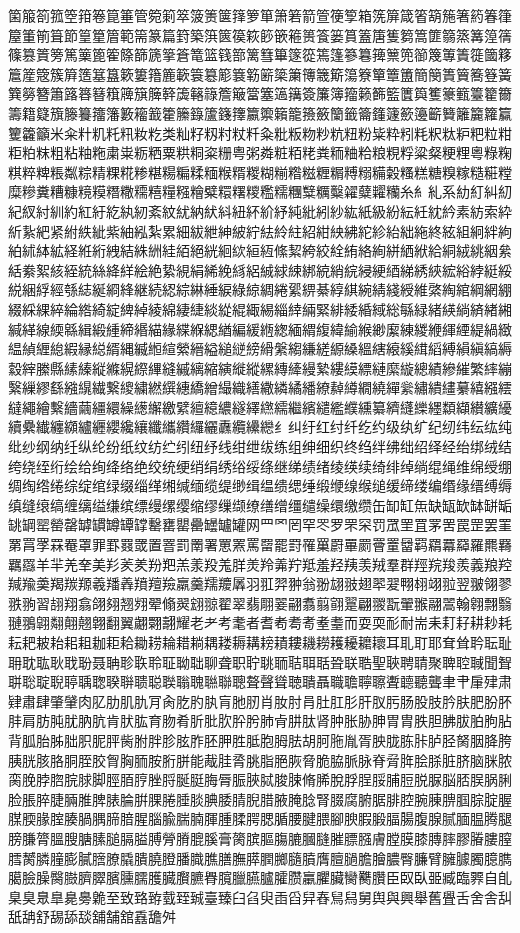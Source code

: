 箘箙箚箛箜箝箞箟箠管箢箣箤箥箦箧箨箩箪箫箬箭箮箯箰箱箲箳箴箵箶箷箸箹箺箻箼箽箾箿節篁篂篃範篅篆篇篈築篊篋篌篍篎篏篐篑篒篓篔篕篖篗篘篙篚篛篜篝篞篟篠篡篢篣篤篥篦篧篨篩篪篫篬篭篮篯篰篱篲篳篴篵篶篷篸篹篺篻篼篽篾篿簀簁簂簃簄簅簆簇簈簉簊簋簌簍簎簏簐簑簒簓簔簕簖簗簘簙簚簛簜簝簞簟簠簡簢簣簤簥簦簧簨簩簪簫簬簭簮簯簰簱簲簳簴簵簶簷簸簹簺簻簼簽簾簿籀籁籂籃籄籅籆籇籈籉籊籋籌籍籎籏籐籑籒籓籔籕籖籗籘籙籚籛籜籝籞籟籠籡籢籣籤籥籦籧籨籩籪籫籬籭籮籯籰籱籲米籴籵籶籷籸籹籺类籼籽籾籿粀粁粂粃粄粅粆粇粈粉粊粋粌粍粎粏粐粑粒粓粔粕粖粗粘粙粚粛粜粝粞粟粠粡粢粣粤粥粦粧粨粩粪粫粬粭粮粯粰粱粲粳粴粵粶粷粸粹粺粻粼粽精粿糀糁糂糃糄糅糆糇糈糉糊糋糌糍糎糏糐糑糒糓糔糕糖糗糘糙糚糛糜糝糞糟糠糡糢糣糤糥糦糧糨糩糪糫糬糭糮糯糰糱糲糳糴糵糶糷糸糹糺系糼糽糾糿紀紁紂紃約紅紆紇紈紉紊紋紌納紎紏紐紑紒紓純紕紖紗紘紙級紛紜紝紞紟素紡索紣紤紥紦紧紨紩紪紫紬紭紮累細紱紲紳紴紵紶紷紸紹紺紻紼紽紾紿絀絁終絃組絅絆絇絈絉絊絋経絍絎絏結絑絒絓絔絕絖絗絘絙絚絛絜絝絞絟絠絡絢絣絤絥給絧絨絩絪絫絬絭絮絯絰統絲絳絴絵絶絷絸絹絺絻絼絽絾絿綀綁綂綃綄綅綆綇綈綉綊綋綌綍綎綏綐綑綒經綔綕綖綗綘継続綛綜綝綞綟綠綡綢綣綤綥綦綧綨綩綪綫綬維綮綯綰綱網綳綴綵綶綷綸綹綺綻綼綽綾綿緀緁緂緃緄緅緆緇緈緉緊緋緌緍緎総緐緑緒緓緔緕緖緗緘緙線緛緜緝緞緟締緡緢緣緤緥緦緧編緩緪緫緬緭緮緯緰緱緲緳練緵緶緷緸緹緺緻緼緽緾緿縀縁縂縃縄縅縆縇縈縉縊縋縌縍縎縏縐縑縒縓縔縕縖縗縘縙縚縛縜縝縞縟縠縡縢縣縤縥縦縧縨縩縪縫縬縭縮縯縰縱縲縳縴縵縶縷縸縹縺縻縼總績縿繀繁繂繃繄繅繆繇繈繉繊繋繌繍繎繏繐繑繒繓織繕繖繗繘繙繚繛繜繝繞繟繠繡繢繣繤繥繦繧繨繩繪繫繬繭繮繯繰繱繲繳繴繵繶繷繸繹繺繻繼繽繾繿纀纁纂纃纄纅纆纇纈纉纊纋續纍纎纏纐纑纒纓纔纕纖纗纘纙纚纛纜纝纞纟纠纡红纣纤纥约级纨纩纪纫纬纭纮纯纰纱纲纳纴纵纶纷纸纹纺纻纼纽纾线绀绁绂练组绅细织终绉绊绋绌绍绎经绐绑绒结绔绕绖绗绘给绚绛络绝绞统绠绡绢绣绤绥绦继绨绩绪绫绬续绮绯绰绱绲绳维绵绶绷绸绹绺绻综绽绾绿缀缁缂缃缄缅缆缇缈缉缊缋缌缍缎缏缐缑缒缓缔缕编缗缘缙缚缛缜缝缞缟缠缡缢缣缤缥缦缧缨缩缪缫缬缭缮缯缰缱缲缳缴缵缶缷缸缹缺缻缼缽缾缿罀罁罂罃罄罅罆罇罈罉罊罋罌罍罎罏罐网罒罓罔罕罖罗罘罙罚罛罜罝罞罟罠罡罢罣罤罥罦罧罨罩罪罫罬罭置罯罰罱署罳罴罵罶罷罸罹罺罻罼罽罾罿羀羁羂羃羄羅羆羇羈羉羊羋羌羍美羏羐羑羒羓羔羕羖羗羘羙羚羛羜羝羞羟羠羡羢羣群羥羦羧羨義羪羫羬羭羮羯羰羱羲羳羴羵羶羷羸羹羺羻羼羽羾羿翀翁翂翃翄翅翆翇翈翉翊翋翌翍翎翏翐翑習翓翔翕翖翗翘翙翚翛翜翝翞翟翠翡翢翣翤翥翦翧翨翩翪翫翬翭翮翯翰翱翲翳翴翵翶翷翸翹翺翻翼翽翾翿耀老耂考耄者耆耇耈耉耊耋而耍耎耏耐耑耒耓耔耕耖耗耘耙耚耛耜耝耞耟耠耡耢耣耤耥耦耧耨耩耪耫耬耭耮耯耰耱耲耳耴耵耶耷耸耹耺耻耼耽耾耿聀聁聂聃聄聅聆聇聈聉聊聋职聍聎聏聐聑聒聓联聕聖聗聘聙聚聛聜聝聞聟聠聡聢聣聤聥聦聧聨聩聪聫聬聭聮聯聰聱聲聳聴聵聶職聸聹聺聻聼聽聾聿肀肁肂肃肄肅肆肇肈肉肊肋肌肍肎肏肐肑肒肓肔肕肖肗肘肙肚肛肜肝肞肟肠股肢肣肤肥肦肧肨肩肪肫肬肭肮肯肰肱育肳肴肵肶肷肸肹肺肻肼肽肾肿胀胁胂胃胄胅胆胇胈胉胊胋背胍胎胏胐胑胒胓胔胕胖胗胘胙胚胛胜胝胞胟胠胡胢胣胤胥胦胧胨胩胪胫胬胭胮胯胰胱胲胳胴胵胶胷胸胹胺胻胼能胾胿脀脁脂脃脄脅脆脇脈脉脊脋脌脍脎脏脐脑脒脓脔脕脖脗脘脙脚脛脜脝脞脟脠脡脢脣脤脥脦脧脨脩脪脫脬脭脮脯脰脱脲脳脴脵脶脷脸脹脺脻脼脽脾脿腀腁腂腃腄腅腆腇腈腉腊腋腌腍腎腏腐腑腒腓腔腕腖腗腘腙腚腛腜腝腞腟腠腡腢腣腤腥腦腧腨腩腪腫腬腭腮腯腰腱腲腳腴腵腶腷腸腹腺腻腼腽腾腿膀膁膂膃膄膅膆膇膈膉膊膋膌膍膎膏膐膑膒膓膔膕膖膗膘膙膚膛膜膝膞膟膠膡膢膣膤膥膦膧膨膩膪膫膬膭膮膯膰膱膲膳膴膵膶膷膸膹膺膻膼膽膾膿臀臁臂臃臄臅臆臇臈臉臊臋臌臍臎臏臐臑臒臓臔臕臖臗臘臙臚臛臜臝臞臟臠臡臢臣臤臥臦臧臨臩自臫臬臭臮臯臰臱臲至致臵臶臷臸臹臺臻臼臽臾臿舀舁舂舃舄舅舆與興舉舊舋舌舍舎舏舐舑舒舓舔舕舖舗舘舙舚舛